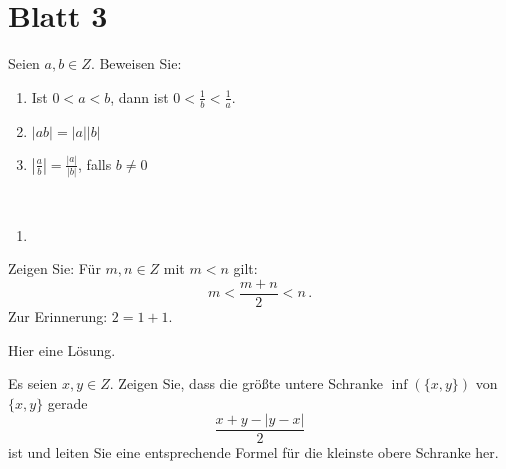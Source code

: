 \section*{Blatt 3}

\setcounter{blatt}{3}

\begin{aufg}[6 Punkte]\label{kleiner}
Seien $a,b\in Z$. Beweisen Sie: 
\begin{enumerate}[label=$\mathrm{(\roman*)}$, ref=$\mathrm{\roman*}$]
\item\label{kleineri} Ist $0<a<b$, dann ist $0<\frac1b<\frac1a$.
\item $|ab| = |a||b|$
\item $\left| \frac{a}{b} \right| = \frac{|a|}{|b|}$, falls $b\not=0$
\end{enumerate}
\end{aufg}


\bigskip

\begin{lsg}\mbox{ }
\begin{enumerate}[label=$\mathrm{(\roman*)}$, ref=$\mathrm{\roman*}$]
\item 
\end{enumerate}
\end{lsg}

\bigskip



\begin{aufg}[4 Punkte]\label{mittel}
Zeigen Sie: Für $m,n\in Z$ mit $m<n$ gilt:
\[ m<\frac{m+n}{2} < n\,.\]
Zur Erinnerung: $2 = 1+1$.
\end{aufg}
 

\bigskip

\begin{lsg}
Hier eine L\"osung. 

\end{lsg}


\bigskip


\begin{aufg}[6 Punkte]
Es seien $x,y\in Z$. Zeigen Sie, dass die gr\"o{\ss}te untere Schranke $\inf(\{x,y\})$ von $\{x,y\}$ gerade 
\[
\frac{x+y - |y-x|}{2}
\]
ist und leiten Sie eine entsprechende Formel f\"ur die kleinste obere Schranke her.
\end{aufg}


\bigskip

\begin{lsg}
\end{lsg}


\bigskip


